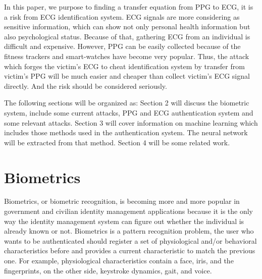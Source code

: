 \documentclass[a4paper,12pt]{article}
\begin{document}
In this paper, we purpose to finding a transfer equation from PPG to ECG, it is a risk from ECG identification system. ECG signals are more considering as sensitive information, which can show not only personal health information but also psychological status\parencite{Damousis:2008unobtrusive}. Because of that, gathering ECG from an individual is difficult and expensive. However, PPG can be easily collected because of the fitness trackers and smart-watches have become very popular\parencite{Blasco:2018feasibility}. Thus, the attack which forges the victim's ECG to cheat identification system by transfer from victim's PPG will be much easier and cheaper than collect victim's ECG signal directly. And the risk should be considered seriously. 

The following sections will be organized as: Section 2 will discuss the biometric system, include some current attacks, PPG and ECG authentication system and some relevant attacks. Section 3 will cover information on machine learning which includes those methods used in the authentication system. The neural network will be extracted from that method. Section 4 will be some related work.

\section{Biometrics}\label{Biometrics}
Biometrics, or biometric recognition, is becoming more and more popular in government and civilian identity management applications because it is the only way the identity management system can figure out whether the individual is already known or not\parencite{Jain:2011bio}. Biometrics is a pattern recognition problem, the user who wants to be authenticated should register a set of physiological and/or behavioral characteristics before and provides a current characteristic to match the previous one\parencite{Blasco:2018feasibility}. For example, physiological characteristics contain a face, iris, and the fingerprints, on the other side, keystroke dynamics, gait, and voice\parencite{Agrafioti:2011heart}. 
\end{document}
